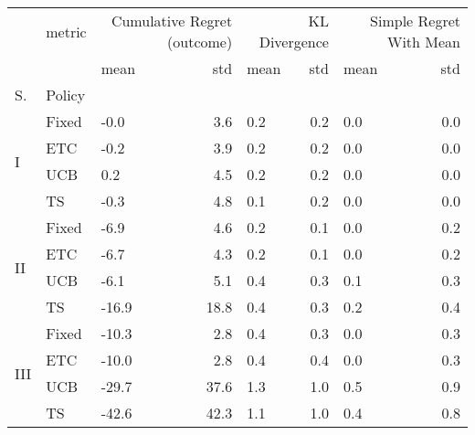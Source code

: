 \begin{tabular}{lllrlrlr}
\toprule
 & metric & \multicolumn{2}{r}{Cumulative Regret (outcome)} & \multicolumn{2}{r}{KL Divergence} & \multicolumn{2}{r}{Simple Regret With Mean} \\
 &  & mean & std & mean & std & mean & std \\
S. & Policy &  &  &  &  &  &  \\
\midrule
\multirow[c]{4}{*}{I} & Fixed & -0.0 & 3.6 & 0.2 & 0.2 & 0.0 & 0.0 \\
 & ETC & -0.2 & 3.9 & 0.2 & 0.2 & 0.0 & 0.0 \\
 & UCB & 0.2 & 4.5 & 0.2 & 0.2 & 0.0 & 0.0 \\
 & TS & -0.3 & 4.8 & 0.1 & 0.2 & 0.0 & 0.0 \\
\multirow[c]{4}{*}{II} & Fixed & -6.9 & 4.6 & 0.2 & 0.1 & 0.0 & 0.2 \\
 & ETC & -6.7 & 4.3 & 0.2 & 0.1 & 0.0 & 0.2 \\
 & UCB & -6.1 & 5.1 & 0.4 & 0.3 & 0.1 & 0.3 \\
 & TS & -16.9 & 18.8 & 0.4 & 0.3 & 0.2 & 0.4 \\
\multirow[c]{4}{*}{III} & Fixed & -10.3 & 2.8 & 0.4 & 0.3 & 0.0 & 0.3 \\
 & ETC & -10.0 & 2.8 & 0.4 & 0.4 & 0.0 & 0.3 \\
 & UCB & -29.7 & 37.6 & 1.3 & 1.0 & 0.5 & 0.9 \\
 & TS & -42.6 & 42.3 & 1.1 & 1.0 & 0.4 & 0.8 \\
\bottomrule
\end{tabular}
